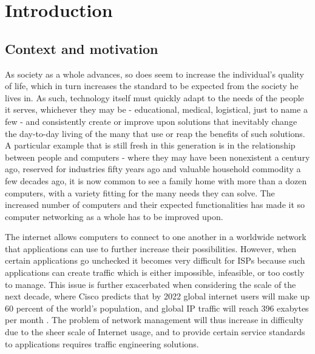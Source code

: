 \chapter{Introduction}

\section{Context and motivation}

    As society as a whole advances, so does seem to increase the individual's quality of life, which in turn increases the standard to be expected from the society he lives in.
    As such, technology itself must quickly adapt to the needs of the people it serves, whichever they may be - educational, medical, logistical, just to name a few - and consistently create or improve upon solutions that inevitably change the day-to-day living of the many that use or reap the benefits of such solutions.
    A particular example that is still fresh in this generation is in the relationship between people and computers - where they may have been nonexistent a century ago, reserved for industries fifty years ago and valuable household commodity a few decades ago, it is now common to see a family home with more than a dozen computers, with a variety fitting for the many needs they can solve.
    The increased number of computers and their expected functionalities has made it so computer networking as a whole has to be improved upon.

    The internet allows computers to connect to one another in a worldwide network that applications can use to further increase their possibilities.
    However, when certain applications go unchecked it becomes very difficult for ISPs because such applications can create traffic which is either impossible, infeasible, or too costly to manage.
    This issue is further exacerbated when considering the scale of the next decade, where Cisco predicts that by 2022 global internet users will make up 60 percent of the world's population, and global IP traffic will reach 396 exabytes per month \cite{cisco2019}.
    The problem of network management will thus increase in difficulty due to the sheer scale of Internet usage, and to provide certain service standards to applications requires traffic engineering solutions.

